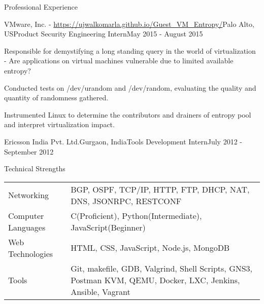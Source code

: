 \documentclass{resume} %
\begin{document}
\begin{rSection}{Professional Experience}
	\begin{rSubsectionEmployment}{VMware, Inc. - \url{https://ujwalkomarla.github.io/Guest_VM_Entropy/}}{Palo Alto, US}{Product Security Engineering Intern}{May 2015 - August 2015}
    	\item Responsible for demystifying a long standing query in the world of
    virtualization - Are applications on virtual machines vulnerable due to limited available entropy?
      	\item Conducted tests on /dev/urandom and /dev/random, evaluating the quality and quantity of randomness gathered.
        \item Instrumented Linux to determine the contributors and drainers of entropy pool and interpret virtualization impact.
	\end{rSubsectionEmployment}
	
    \begin{rSubsectionEmploymentSimple}{Ericsson India Pvt. Ltd.}{Gurgaon, India}{Tools Development Intern}{July 2012 - September 2012}
        \begin{comment}
        	\item Programmed tools for Excel, that compressed network statistics to a dashboard representation.
          	\item The automation saved the team from manual work and provided opportunity to improve and find new sales.   
        \end{comment}
   	\end{rSubsectionEmploymentSimple}
    
\end{rSection}


\begin{rSection}{Technical Strengths}
    \begin{tabularx}{\textwidth}{lX}%
        Networking & BGP, OSPF, TCP/IP, HTTP, FTP, DHCP, NAT, DNS, JSONRPC, RESTCONF\\ 
        Computer Languages & C(Proficient), Python(Intermediate), JavaScript(Beginner)\\
        Web Technologies & HTML, CSS, JavaScript, Node.js, MongoDB\\
        Tools & Git, makefile, GDB, Valgrind, Shell Scripts, GNS3, Postman \newline KVM, QEMU, Docker, LXC, Jenkins, Ansible, Vagrant 
    \end{tabularx}
\end{rSection}
\end{document}

